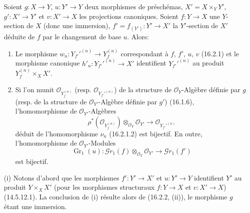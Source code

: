 \begin{corollary}[16.2.3]
\label{IV.16.2.3}
Soient $g:X\to Y$, $u:Y'\to Y$ deux morphismes de préschémas,
$X'=X\times_Y Y'$, $g':X'\to Y'$ et $v:X'\to X$ les projections canoniques.
Soient $f:Y\to X$ une $Y$-section de $X$ (donc une immersion),
$f'=f_{(Y')}:Y'\to X'$ la $Y'$-section de $X'$ déduite de $f$ par le
changement de base $u$. Alors:
\begin{enumerate}
\item[\textup{(i)}] Le morphisme
$w_n:Y_{f'}'^{(n)}\to Y_f^{(n)}$ correspondant à $f$, $f'$, $u$, $v$
\textup{(16.2.1)} et le morphisme canonique
$h'_n:Y_{f'}'^{(n)}\to X'$ identifient $Y_{f'}'^{(n)}$ au produit
$Y_f^{(n)}\times_X X'$.
\item[\textup{(ii)}] Si l'on munit $\mathcal{O}_{Y_f^{(n)}}$ \textup{(resp.}
$\mathcal{O}_{Y_{f'}'^{(n)}}$\textup{)} de la structure de $\mathcal{O}_Y$-Algèbre
définie par $g$ \textup{(resp.} de la structure de $\mathcal{O}_{Y'}$-Algèbre définie
par $g'$\textup{)} \textup{(16.1.6)}, l'homomorphisme de $\mathcal{O}_{Y'}$-Algèbres
\[
  \rho^*(\mathcal{O}_{Y_f^{(n)}})
  \otimes_{\mathcal{O}_Y}\mathcal{O}_{Y'}
  \longrightarrow
  \mathcal{O}_{Y_{f'}'^{(n)}}
  \tag{16.2.3.1}
  \label{IV.16.2.3.1}
\]
déduit de l'homomorphisme $\nu_n$ \textup{(16.2.1.2)} est bijectif. En outre,
l'homomorphisme de $\mathcal{O}_{Y'}$-Modules
\[
  \operatorname{Gr}_1(u):
  \mathscr{G}r_1(f)\otimes_{\mathcal{O}_Y}\mathcal{O}_{Y'}
  \longrightarrow\mathscr{G}r_1(f')
  \tag{16.2.3.2}
  \label{IV.16.2.3.2}
\]
est bijectif.
\end{enumerate}
\end{corollary}

\noindent(i) Notons d'abord que les morphismes $f':Y'\to X'$ et $u:Y'\to Y$
identifient $Y'$ au produit $Y\times_X X'$ (pour les morphismes structuraux
$f:Y\to X$ et $v:X'\to X$) (14.5.12.1). La conclusion de (i) résulte alors de
(16.2.2, (ii)), le morphisme $g$ étant une immersion.

